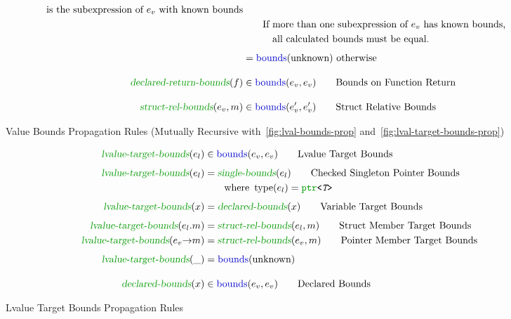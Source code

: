 \begin{figure}[ht]
\begin{align*}
                  \text{ is the subexpression of } e_v
                  \text{ with known bounds} \\
                &\qquad
                  \text{If more than one subexpression of } e_v
                  \text{ has known bounds,}\\
                &\qquad\quad
                  \text{all calculated bounds must be equal.} \\[1ex]
                &= \mbounds(\text{unknown}) \text{ otherwise}\\[1em]
  \rbounds(f) &\in \mbounds(e_v, e_v) \tag*{Bounds on Function Return} \\[1em]
  \srbounds(e_v, m) &\in \mbounds(e_v', e_v') \tag*{Struct Relative Bounds}
\end{align*}
\caption[Value Bounds Propagation Rules]{Value Bounds Propagation Rules (Mutually
Recursive with~\autoref{fig:lval-bounds-prop}
and~\autoref{fig:lval-target-bounds-prop})}
\label{fig:val-bounds-prop}
\end{figure}

\begin{figure}[ht]
\begin{align*}
  \ltbounds(e_l) &\in \mbounds(e_v, e_v) \tag*{Lvalue Target Bounds} \\[1ex]
  \ltbounds(e_l) &= \sbounds(e_l) \tag*{Checked Singleton Pointer Bounds}\\
                 &\qquad \text{where } \typeof(e_l) = \PtrT \\[1ex]
  \ltbounds(x) &= \dbounds(x) \tag*{Variable Target Bounds}\\[1ex]
  \ltbounds(e_l \member m) &= \srbounds(e_l, m) \tag*{Struct Member Target Bounds}\\
  \ltbounds(e_v \arrow m) &= \srbounds(e_v, m) \tag*{Pointer Member Target Bounds}\\[1ex]
  \ltbounds(\_) &= \mbounds(\text{unknown}) \\[1em]
  \dbounds(x) &\in \mbounds(e_v, e_v) \tag*{Declared Bounds}
\end{align*}
\caption[Lvalue Target Bounds Propagation Rules]{Lvalue Target Bounds
Propagation Rules}
\label{fig:lval-target-bounds-prop}
\end{figure}

